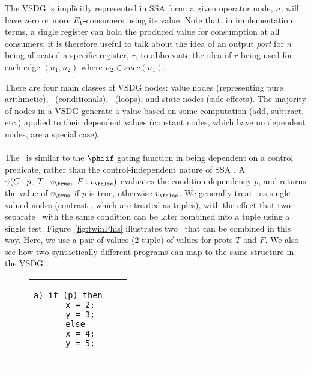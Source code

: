 {The VSDG is implicitly represented in SSA form: 
a given operator node, $n$, will have zero or more $E_V$-consumers using its value. 
Note that, in implementation terms, a single register can hold the produced value for consumption at all consumers; 
it is therefore useful to talk about the idea of an output {\em port} for $n$ being allocated a specific register, $r$, to abbreviate the idea of $r$ being used for each edge $(n_1,n_2)$ where $n_2 \in \textit{succ}(n_1)$.


There are four main classes of VSDG nodes: 
value nodes (representing pure arithmetic), \Gns\ (conditionals), \Tns\ (loops), and state nodes (side effects). 
The majority of nodes in a VSDG generate a value based on some computation (add, subtract, etc.) applied to their dependent values (constant nodes, which have no dependent nodes, are a special case).



\paragraph{\Gns}
The \Gn\ is similar to the $\phiif$ gating function in being dependent on a control predicate, rather than the control-independent nature of SSA \phifuns.
A \Gn\ $\gamma(C:p,\ T:v_{\true},\ F:v_{\false})$ evaluates the condition dependency $p$, and returns the value of $v_{\true}$ if $p$ is true, otherwise $v_{\false}$.
We generally treat \Gns\ as single-valued nodes (contrast \Tns, which are treated as tuples), with the effect that two separate \Gns\ with the same condition can be later combined into a tuple using a single test. 
Figure~\ref{fig:twinPhis} illustrates two \Gns\ that can be combined in this way. 
Here, we use a pair of values (2-tuple) of values for prots $T$ and $F$. 
We also see how two syntactically different programs can map to the same structure in the VSDG.

\begin{figure}[!hb]
\centering
\begin{tabular}{ccc}	\cline{1-1}
\begin{minipage}[l]{2.0in}
\begin{verbatim}
a) if (p) then
     x = 2;
     y = 3;
   else
     x = 4;
     y = 5;


\end{verbatim}
\end{minipage}
\end{tabular}
\end{figure}}
